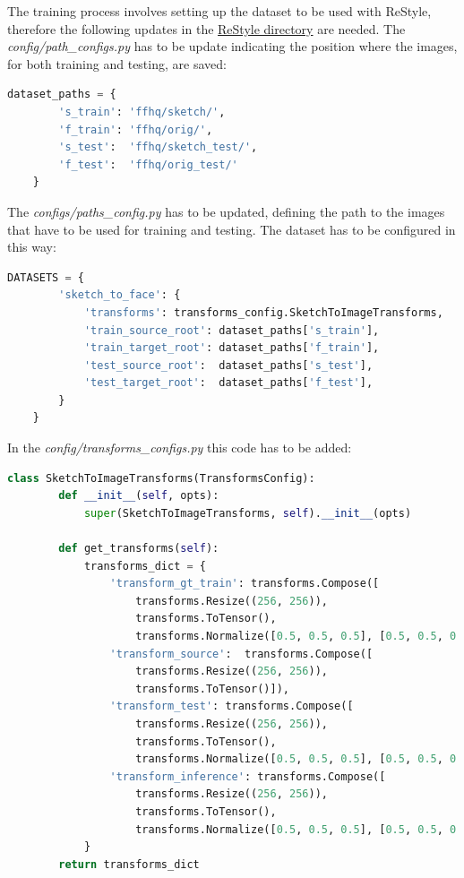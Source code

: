 \noindent The training process involves setting up the dataset to be used with ReStyle, therefore the following updates in the \href{https://github.com/yuval-alaluf/restyle-encoder}{ReStyle directory} are needed. The \textit{config/path\_configs.py} has to be update indicating the position where the images, for both training and testing, are saved:
\begin{lstlisting}[language=Python, numbers=none]
    dataset_paths = {
        's_train': 'ffhq/sketch/',
        'f_train': 'ffhq/orig/',
        's_test':  'ffhq/sketch_test/',
        'f_test':  'ffhq/orig_test/'
    }
\end{lstlisting}
The \textit{configs/paths\_config.py} has to be updated, defining the path to the images that have to be used for training and testing. The dataset has to be configured in this way:
\begin{lstlisting}[language=Python, numbers=none]
    DATASETS = {
        'sketch_to_face': {
            'transforms': transforms_config.SketchToImageTransforms,
            'train_source_root': dataset_paths['s_train'],
            'train_target_root': dataset_paths['f_train'],
            'test_source_root':  dataset_paths['s_test'],
            'test_target_root':  dataset_paths['f_test'],
        }
    }
\end{lstlisting}
In the \textit{config/transforms\_configs.py} this code has to be added:
\begin{lstlisting}[language=Python, numbers=none]
    class SketchToImageTransforms(TransformsConfig):
        def __init__(self, opts):
            super(SketchToImageTransforms, self).__init__(opts)
    
        def get_transforms(self):
            transforms_dict = {
                'transform_gt_train': transforms.Compose([
                    transforms.Resize((256, 256)),
                    transforms.ToTensor(),
                    transforms.Normalize([0.5, 0.5, 0.5], [0.5, 0.5, 0.5])]),
                'transform_source':  transforms.Compose([
                    transforms.Resize((256, 256)),
                    transforms.ToTensor()]),
                'transform_test': transforms.Compose([
                    transforms.Resize((256, 256)),
                    transforms.ToTensor(),
                    transforms.Normalize([0.5, 0.5, 0.5], [0.5, 0.5, 0.5])]),
                'transform_inference': transforms.Compose([
                    transforms.Resize((256, 256)),
                    transforms.ToTensor(),
                    transforms.Normalize([0.5, 0.5, 0.5], [0.5, 0.5, 0.5])])
            }
        return transforms_dict
\end{lstlisting}
